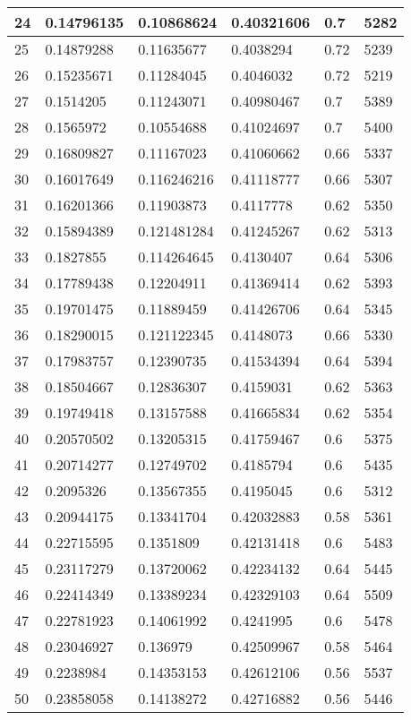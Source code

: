 \begin{longtable}{|l|l|l|l|l|l|}
24 & 0.14796135 & 0.10868624 & 0.40321606 & 0.7 & 5282 \\ \hline 
25 & 0.14879288 & 0.11635677 & 0.4038294 & 0.72 & 5239 \\ \hline 
26 & 0.15235671 & 0.11284045 & 0.4046032 & 0.72 & 5219 \\ \hline 
27 & 0.1514205 & 0.11243071 & 0.40980467 & 0.7 & 5389 \\ \hline 
28 & 0.1565972 & 0.10554688 & 0.41024697 & 0.7 & 5400 \\ \hline 
29 & 0.16809827 & 0.11167023 & 0.41060662 & 0.66 & 5337 \\ \hline 
30 & 0.16017649 & 0.116246216 & 0.41118777 & 0.66 & 5307 \\ \hline 
31 & 0.16201366 & 0.11903873 & 0.4117778 & 0.62 & 5350 \\ \hline 
32 & 0.15894389 & 0.121481284 & 0.41245267 & 0.62 & 5313 \\ \hline 
33 & 0.1827855 & 0.114264645 & 0.4130407 & 0.64 & 5306 \\ \hline 
34 & 0.17789438 & 0.12204911 & 0.41369414 & 0.62 & 5393 \\ \hline 
35 & 0.19701475 & 0.11889459 & 0.41426706 & 0.64 & 5345 \\ \hline 
36 & 0.18290015 & 0.121122345 & 0.4148073 & 0.66 & 5330 \\ \hline 
37 & 0.17983757 & 0.12390735 & 0.41534394 & 0.64 & 5394 \\ \hline 
38 & 0.18504667 & 0.12836307 & 0.4159031 & 0.62 & 5363 \\ \hline 
39 & 0.19749418 & 0.13157588 & 0.41665834 & 0.62 & 5354 \\ \hline 
40 & 0.20570502 & 0.13205315 & 0.41759467 & 0.6 & 5375 \\ \hline 
41 & 0.20714277 & 0.12749702 & 0.4185794 & 0.6 & 5435 \\ \hline 
42 & 0.2095326 & 0.13567355 & 0.4195045 & 0.6 & 5312 \\ \hline 
43 & 0.20944175 & 0.13341704 & 0.42032883 & 0.58 & 5361 \\ \hline 
44 & 0.22715595 & 0.1351809 & 0.42131418 & 0.6 & 5483 \\ \hline 
45 & 0.23117279 & 0.13720062 & 0.42234132 & 0.64 & 5445 \\ \hline 
46 & 0.22414349 & 0.13389234 & 0.42329103 & 0.64 & 5509 \\ \hline 
47 & 0.22781923 & 0.14061992 & 0.4241995 & 0.6 & 5478 \\ \hline 
48 & 0.23046927 & 0.136979 & 0.42509967 & 0.58 & 5464 \\ \hline 
49 & 0.2238984 & 0.14353153 & 0.42612106 & 0.56 & 5537 \\ \hline 
50 & 0.23858058 & 0.14138272 & 0.42716882 & 0.56 & 5446 \\ \hline 
\end{longtable}